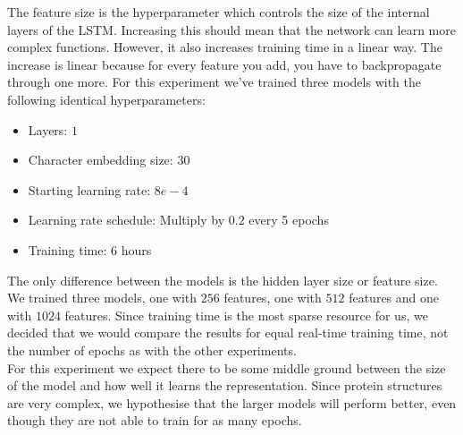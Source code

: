 The feature size is the hyperparameter which controls the size of the internal layers of the LSTM. Increasing this should mean that the network can learn more complex functions. However, it also increases training time in a linear way. The increase is linear because for every feature you add, you have to backpropagate through one more. For this experiment we've trained three models with the following identical hyperparameters:
\begin{itemize}
	\item Layers: $1$
	\item Character embedding size: 30
	\item Starting learning rate: $8e-4$
	\item Learning rate schedule: Multiply by $0.2$ every 5 epochs
	\item Training time: 6 hours
\end{itemize}
The only difference between the models is the hidden layer size or feature size. We trained three models, one with $256$ features, one with $512$ features and one with $1024$ features. Since training time is the most sparse resource for us, we decided that we would compare the results for equal real-time training time, not the number of epochs as with the other experiments.\\

\noindent
For this experiment we expect there to be some middle ground between the size of the model and how well it learns the representation. Since protein structures are very complex, we hypothesise that the larger models will perform better, even though they are not able to train for as many epochs.
